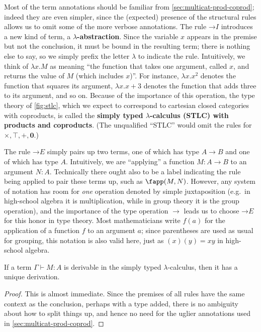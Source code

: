 \documentclass{book}
\let\types\vdash
\def\unit{\top}%
\def\zero{\mathbf{0}}
\def\toI{\mathord{\to}I}
\def\toE{\mathord{\to}E}
\begin{document}
Most of the term annotations should be familiar from \cref{sec:multicat-prod-coprod}; indeed they are even simpler, since the (expected) presence of the structural rules allows us to omit some of the more verbose annotations.
The rule $\toI$ introduces a new kind of term, a \textbf{$\lambda$-abstraction}.
Since the variable $x$ appears in the premise but not the conclusion, it must be bound in the resulting term; there is nothing else to say, so we simply prefix the letter $\lambda$ to indicate the rule.
Intuitively, we think of $\lambda x.M$ as meaning ``the function that takes one argument, called $x$, and returns the value of $M$ (which includes $x$)''.
For instance, $\lambda x.x^2$ denotes the function that squares its argument, $\lambda x.x+3$ denotes the function that adds three to its argument, and so on.
Because of the importance of this operation, the type theory of \cref{fig:stlc}, which we expect to correspond to cartesian closed categories with coproducts, is called the \textbf{simply typed $\lambda$-calculus (STLC) with products and coproducts}.
(The unqualified ``STLC'' would omit the rules for $\times,\unit,+,\zero$.)

The rule $\toE$ simply pairs up two terms, one of which has type $A\to B$ and one of which has type $A$.
Intuitively, we are ``applying'' a function $M:A\to B$ to an argument $N:A$.
Technically there ought also to be a label indicating the rule being applied to pair these terms up, such as $\fapp(M,N)$.
However, any system of notation has room for \emph{one} operation denoted by simple juxtaposition (e.g.\ in high-school algebra it is multiplication, while in group theory it is the group operation), and the importance of the type operation $\to$ leads us to choose $\toE$ for this honor in type theory.
Most mathematicians write $f(a)$ for the application of a function $f$ to an argument $a$; since parentheses are used as usual for grouping, this notation is also valid here, just as $(x)(y)=xy$ in high-school algebra.

\begin{lem}\label{thm:stlc-uniqderiv}
  If a term $\Gamma\types M:A$ is derivable in the simply typed $\lambda$-calculus, then it has a unique derivation.
\end{lem}
\begin{proof}
  This is almost immediate.
  Since the premises of all rules have the same context as the conclusion, perhaps with a type added, there is no ambiguity about how to split things up, and hence no need for the uglier annotations used in \cref{sec:multicat-prod-coprod}.
\end{proof}
\end{document}
